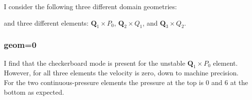 I consider the following three different domain geometries:
\begin{center}

\end{center}
and three different elements: ${\bm Q}_1\times P_0$, ${\bm Q}_2\times Q_1$, and ${\bm Q}_3\times Q_2$.

\subsubsection{geom=0}

I find that the checkerboard mode is present for the unstable ${\bm Q}_1\times P_0$
element. However, for all three elements the velocity is zero, down to machine precision.
For the two continuous-pressure elements the pressure at the top is 0 and 6 at the 
bottom as expected.

